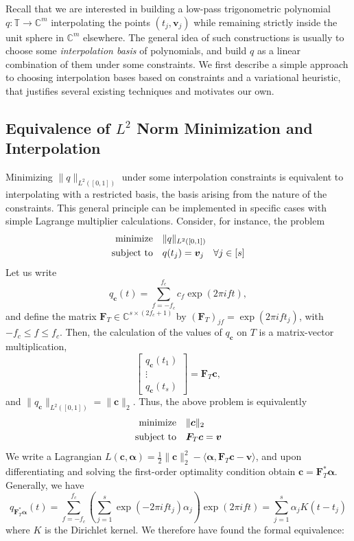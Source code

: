 \documentclass[11pt]{article}
\newcommand{\ra}{\rangle}
\newcommand{\la}{\langle}
\newcommand{\TT}{\mathbb{T}}
\newcommand{\CC}{\mathbb{C}}
\newcommand{\HS}{\hspace{3.5mm}}
\newcommand{\balpha}{\bm \alpha}
\newcommand{\bF}{\bm F}
\newcommand{\bc}{\bm c}
\newcommand{\bv}{\bm v}
\begin{document}
Recall that we are interested in building a low-pass trigonometric polynomial $q: \TT \to \CC^m$ interpolating the points $(t_j, \bv_j)$ while remaining strictly inside the unit sphere in $\CC^m$ elsewhere.
The general idea of such constructions is usually to choose some \emph{interpolation basis} of polynomials, and build $q$ as a linear combination of them under some constraints.
We first describe a simple approach to choosing interpolation bases based on constraints and a variational heuristic, that justifies several existing techniques and motivates our own.

\subsection{Equivalence of $L^2$ Norm Minimization and Interpolation}

Minimizing $\|q\|_{L^2([0, 1])}$ under some interpolation constraints is equivalent to interpolating with a restricted basis, the basis arising from the nature of the constraints.
This general principle can be implemented in specific cases with simple Lagrange multiplier calculations.
Consider, for instance, the problem
\begin{align}
  \text{minimize} &\HS \|q\|_{L^2([0, 1])} \\
  \text{subject to} &\HS q(t_j) = \bv_j \HS \forall j \in [s]
\end{align}
Let us write
\[ q_{\bc}(t) = \sum_{f = -f_c}^{f_c} c_f \exp(2\pi i ft), \]
and define the matrix $\bF_T \in \CC^{s \times (2f_c + 1)}$ by $(\bF_T)_{jf} = \exp(2\pi i ft_j)$, with $-f_c \leq f \leq f_c$.
Then, the calculation of the values of $q_{\bc}$ on $T$ is a matrix-vector multiplication,
\[ \left[\begin{array}{c} q_{\bc}(t_1) \\ \vdots \\ q_{\bc}(t_s) \end{array}\right] = \bF_T \bc, \]
and $\|q_{\bc}\|_{L^2([0, 1])} = \|\bc\|_{2}$.
Thus, the above problem is equivalently
\begin{align}
  \text{minimize} &\HS \|\bc\|_{2} \\
  \text{subject to} &\HS \bF_T\bc = \bv
\end{align}
We write a Lagrangian $L(\bc, \balpha) = \frac{1}{2}\|\bc\|_2^2 - \la \bm \alpha, \bF_T\bc - \bv \ra$, and upon differentiating and solving the first-order optimality condition obtain $\bc = \bF_T^*\bm \alpha$.
Generally, we have
\[ q_{\bF_T^* \bm \alpha}(t) = \sum_{f = -f_c}^{f_c} \left(\sum_{j = 1}^s \exp(-2\pi i ft_j)\alpha_j\right)\exp(2\pi i f t) = \sum_{j = 1}^s \alpha_jK(t - t_j) \]
where $K$ is the Dirichlet kernel.
We therefore have found the formal equivalence:
\end{document}
